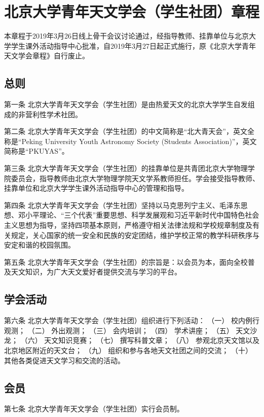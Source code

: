 \chapter{北京大学青年天文学会（学生社团）章程}

本章程于2019年3月26日线上骨干会议讨论通过，经指导教师、挂靠单位与北京大学学生课外活动指导中心批准，自2019年3月27日起正式施行，原《北京大学青年天文学会章程》自行废止。

\section{总则}

第一条  北京大学青年天文学会（学生社团）是由热爱天文的北京大学学生自发组成的非营利性学术社团。

第二条  北京大学青年天文学会（学生社团）的中文简称是“北大青天会”，英文全称是“Peking University Youth Astronomy Society (Students Association)”，英文简称是“PKUYAS”。

第三条  北京大学青年天文学会（学生社团）的挂靠单位是共青团北京大学物理学院委员会，指导教师由北京大学物理学院天文学系教师担任。学会接受指导教师、挂靠单位和北京大学学生课外活动指导中心的管理和指导。

第四条  北京大学青年天文学会（学生社团）坚持以马克思列宁主义、毛泽东思想、邓小平理论、“三个代表”重要思想、科学发展观和习近平新时代中国特色社会主义思想为指导，坚持四项基本原则，严格遵守相关法律法规和学校规章制度及有关规定，关心国家的统一安全和民族的安定团结，维护学校正常的教学科研秩序与安定和谐的校园氛围。

第五条  北京大学青年天文学会（学生社团）的宗旨是：以会员为本，面向全校普及天文知识，为广大天文爱好者提供交流与学习的平台。

\section{学会活动}

第六条  北京大学青年天文学会（学生社团）组织进行下列活动：
（一）  校内例行观测；
（二）  外出观测；
（三）  会内培训；
（四）  学术讲座；
（五）  天文沙龙；
（六）  天文知识竞赛；
（七）  撰写科普文章；
（八）  参观北京天文馆以及北京地区附近的天文台；
（九）  组织和参与各地天文社团之间的交流；
（十）  其他各类促进天文学习和交流的活动。

\section{会员}

第七条  北京大学青年天文学会（学生社团）实行会员制。

